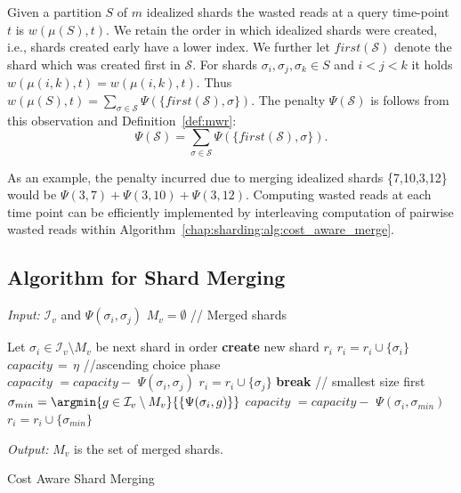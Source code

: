 Given a partition $S$ of $m$ idealized shards the wasted reads at a query time-point $t$ is $w(\mu(S), t)$. We retain the order in which idealized shards were created, i.e., shards created early have a lower index. We further let $first(\mathcal{S})$ denote the shard which was created first in $\mathcal{S}$. For shards $\sigma_i, \sigma_j, \sigma_k \in S$ and $i < j < k$ it holds $w(\mu({i,k}),t) = w(\mu({i,k}),t)$. Thus $w(\mu(S), t) = \sum_{\sigma \in \mathcal{S}}{\Psi(\{first(\mathcal{S}),\sigma\})}$. The penalty $\Psi(\mathcal{S})$ is follows from this observation and Definition~\ref{def:mwr}:
$$
\Psi(\mathcal{S}) = \sum_{\sigma \in \mathcal{S}}{\Psi(\{first(\mathcal{S}),\sigma\})}.
$$
 
As an example, the penalty incurred due to merging idealized shards \{7,10,3,12\} would be $\Psi(3,7) + \Psi(3,10) +
\Psi(3,12)$. Computing wasted reads at each time point can be efficiently implemented by interleaving computation of pairwise wasted reads within Algorithm~\ref{chap:sharding:alg:cost_aware_merge}.
 
\subsection{Algorithm for Shard Merging}

\begin{algorithm}[htb!]
   \begin{algorithmic}[1]
     \STATE  \emph{Input:} $\mathcal{I}_v$ and ${\Psi(\sigma_{i},\sigma_{j})}$ 
     \STATE $M_v = \emptyset$ \quad // Merged shards
 	
	\STATE {} 
			\STATE Let $\sigma_i \in \mathcal{I}_v \setminus  M_v$ be next shard in order
			\STATE \textbf{create} new shard $r_i$
			\STATE $r_i = r_i \cup \{\sigma_i\} $			
			\STATE $capacity \,=\, \eta$
			\STATE
			\STATE //ascending choice phase \\
					\STATE $capacity \,\, = capacity - \,\, \Psi(\sigma_i,\sigma_j)$
					\STATE $r_i = r_i \cup \{\sigma_j\}$
				 \ELSE {}
					\STATE \textbf{break}
					\ENDIF
				\ENDIF
			\ENDFOR
			\STATE
			\STATE // smallest size first
				    \STATE $\sigma_{min} = \argmin{g \in \mathcal{I}_v \setminus M_v}{\{\Psi(\sigma_i, g)\}}$
					\STATE $capacity \,\, =  capacity - \,\,\Psi(\sigma_i,\sigma_{min})$
					\STATE $r_i = r_i \cup \{\sigma_{min}\}$
			\ENDWHILE
			
		\ENDFOR
\STATE
\STATE\emph{Output:} $M_v$ is the set of merged shards.

   \end{algorithmic}
   \caption{Cost Aware Shard Merging}
   \label{chap:sharding:alg:cost_aware_merge}
 \end{algorithm}


